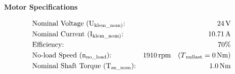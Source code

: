 \begin{center}
    \textbf{Motor Specifications}
\end{center}

\begin{align*}
    &\text{Nominal Voltage (U\textsubscript{klem\_nom)}:} & 24 \, \text{V} \\
    &\text{Nominal Current (I\textsubscript{klem\_nom)}:} & 10.71 \, \text{A} \\
    &\text{Efficiency:} & 70\% \\
    &\text{No-load Speed (n\textsubscript{no\_load}):} & 1910 \, \text{rpm} \quad (T\textsubscript{nullast} = 0 \, \text{Nm}) \\
    &\text{Nominal Shaft Torque (T\textsubscript{as\_nom}):} & 1.0 \, \text{Nm}
\end{align*}


